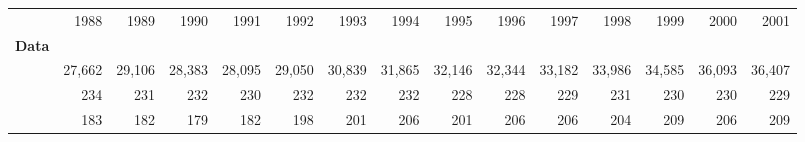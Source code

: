 \begin{tabular}{lllllllllllllll}
\cline{1-15}
\multicolumn{1}{c}{} &
  \multicolumn{1}{|r}{1988} &
  \multicolumn{1}{r}{1989} &
  \multicolumn{1}{r}{1990} &
  \multicolumn{1}{r}{1991} &
  \multicolumn{1}{r}{1992} &
  \multicolumn{1}{r}{1993} &
  \multicolumn{1}{r}{1994} &
  \multicolumn{1}{r}{1995} &
  \multicolumn{1}{r}{1996} &
  \multicolumn{1}{r}{1997} &
  \multicolumn{1}{r}{1998} &
  \multicolumn{1}{r}{1999} &
  \multicolumn{1}{r}{2000} &
  \multicolumn{1}{r}{2001} \\
\cline{1-15}
\multicolumn{1}{l}{\textbf{Data}} &
  \multicolumn{1}{|r}{} &
  \multicolumn{1}{r}{} &
  \multicolumn{1}{r}{} &
  \multicolumn{1}{r}{} &
  \multicolumn{1}{r}{} &
  \multicolumn{1}{r}{} &
  \multicolumn{1}{r}{} &
  \multicolumn{1}{r}{} &
  \multicolumn{1}{r}{} &
  \multicolumn{1}{r}{} &
  \multicolumn{1}{r}{} &
  \multicolumn{1}{r}{} &
  \multicolumn{1}{r}{} &
  \multicolumn{1}{r}{} \\ \hline
\multicolumn{1}{l}{\hspace{1em}{$\#$ obs.}} &
  \multicolumn{1}{|r}{27,662} &
  \multicolumn{1}{r}{29,106} &
  \multicolumn{1}{r}{28,383} &
  \multicolumn{1}{r}{28,095} &
  \multicolumn{1}{r}{29,050} &
  \multicolumn{1}{r}{30,839} &
  \multicolumn{1}{r}{31,865} &
  \multicolumn{1}{r}{32,146} &
  \multicolumn{1}{r}{32,344} &
  \multicolumn{1}{r}{33,182} &
  \multicolumn{1}{r}{33,986} &
  \multicolumn{1}{r}{34,585} &
  \multicolumn{1}{r}{36,093} &
  \multicolumn{1}{r}{36,407} \\
\multicolumn{1}{l}{\hspace{1em}{$\#$ sectors}} &
  \multicolumn{1}{|r}{234} &
  \multicolumn{1}{r}{231} &
  \multicolumn{1}{r}{232} &
  \multicolumn{1}{r}{230} &
  \multicolumn{1}{r}{232} &
  \multicolumn{1}{r}{232} &
  \multicolumn{1}{r}{232} &
  \multicolumn{1}{r}{228} &
  \multicolumn{1}{r}{228} &
  \multicolumn{1}{r}{229} &
  \multicolumn{1}{r}{231} &
  \multicolumn{1}{r}{230} &
  \multicolumn{1}{r}{230} &
  \multicolumn{1}{r}{229} \\
\multicolumn{1}{l}{\hspace{1em}{$\#$ origin countries}} &
  \multicolumn{1}{|r}{183} &
  \multicolumn{1}{r}{182} &
  \multicolumn{1}{r}{179} &
  \multicolumn{1}{r}{182} &
  \multicolumn{1}{r}{198} &
  \multicolumn{1}{r}{201} &
  \multicolumn{1}{r}{206} &
  \multicolumn{1}{r}{201} &
  \multicolumn{1}{r}{206} &
  \multicolumn{1}{r}{206} &
  \multicolumn{1}{r}{204} &
  \multicolumn{1}{r}{209} &
  \multicolumn{1}{r}{206} &
  \multicolumn{1}{r}{209} \\

\end{tabular}
